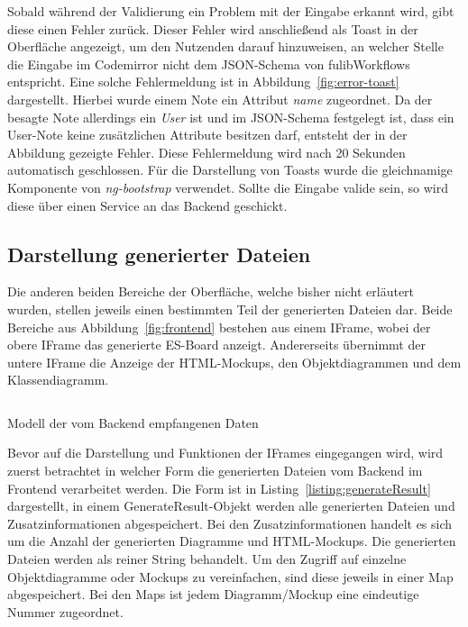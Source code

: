 Sobald während der Validierung ein Problem mit der Eingabe erkannt wird, gibt diese einen Fehler zurück.
Dieser Fehler wird anschließend als Toast in der Oberfläche angezeigt, um den Nutzenden darauf hinzuweisen, an welcher Stelle die Eingabe im Codemirror nicht
dem JSON-Schema von fulibWorkflows entspricht.
Eine solche Fehlermeldung ist in Abbildung~\ref{fig:error-toast} dargestellt.
Hierbei wurde einem Note ein Attribut \textit{name} zugeordnet.
Da der besagte Note allerdings ein \textit{User} ist und im JSON-Schema festgelegt ist, dass ein User-Note keine zusätzlichen Attribute
besitzen darf, entsteht der in der Abbildung gezeigte Fehler.
Diese Fehlermeldung wird nach 20 Sekunden automatisch geschlossen.
Für die Darstellung von Toasts wurde die gleichnamige Komponente von \textit{ng-bootstrap} verwendet.
Sollte die Eingabe valide sein, so wird diese über einen Service an das Backend geschickt.

\subsection{Darstellung generierter Dateien}\label{subsec:darstellung-generierter-dateien}
Die anderen beiden Bereiche der Oberfläche, welche bisher nicht erläutert wurden, stellen jeweils einen bestimmten Teil der generierten Dateien dar.
Beide Bereiche aus Abbildung~\ref{fig:frontend} bestehen aus einem IFrame, wobei der obere IFrame das generierte \ac{ES}-Board anzeigt.
Andererseits übernimmt der untere IFrame die Anzeige der HTML-Mockups, den Objektdiagrammen und dem Klassendiagramm.

\begin{listing}[!ht]
    \inputminted{ts}{listings/3.2/GenerateResult.ts}
    \caption{Modell der vom Backend empfangenen Daten}
    \label{listing:generateResult}
\end{listing}

Bevor auf die Darstellung und Funktionen der IFrames eingegangen wird, wird zuerst betrachtet in welcher Form die generierten Dateien vom Backend im Frontend verarbeitet werden.
Die Form ist in Listing~\ref{listing:generateResult} dargestellt, in einem GenerateResult-Objekt werden alle generierten Dateien und Zusatzinformationen abgespeichert.
Bei den Zusatzinformationen handelt es sich um die Anzahl der generierten Diagramme und HTML-Mockups.
Die generierten Dateien werden als reiner String behandelt.
Um den Zugriff auf einzelne Objektdiagramme oder Mockups zu vereinfachen, sind diese jeweils in einer Map abgespeichert.
Bei den Maps ist jedem Diagramm/Mockup eine eindeutige Nummer zugeordnet.

